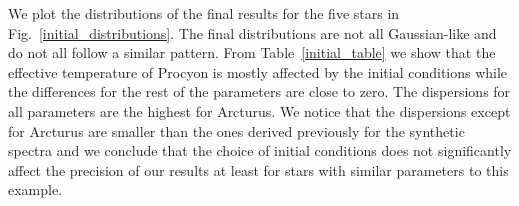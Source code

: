 \documentclass[fleqn,usenatbib]{mnras}
\begin{document}
We plot the distributions of the final results for the five stars in Fig.~\ref{initial_distributions}. The final distributions are not all Gaussian-like and do not all follow a similar pattern. 
From Table~\ref{initial_table} we show that the effective temperature of Procyon is mostly affected by the initial conditions while the differences for the rest of the parameters are close to 
zero. The dispersions for all parameters are the highest for Arcturus. 
We notice that the dispersions except for Arcturus are smaller than the ones derived previously for the synthetic spectra 
and we conclude that the choice of initial conditions does not significantly affect the precision of our results at least for stars with similar parameters to this example.

\end{document}
